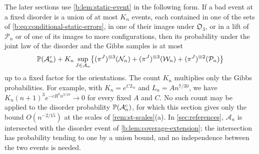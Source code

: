 \begin{remark}\label{rem:st-two-levels}
The later sections use \cref{b:lem:static-event} in the following form. If a bad event at a fixed disorder is a union of at most $K_n$ events, each contained in one of the sets of \eqref{b:eq:conditional-static-errors}, in one of their images under $\mathfrak O_3$, or in a lift of $\mathcal P_n$ or of one of its images to more configurations, then its probability under the joint law of the disorder and the Gibbs samples is at most
\[
 \mathbb P(\mathcal A_n^c)+K_n\sup_{J\in\mathcal A_n}\bigl\{(\pi^J)^{\otimes3}(\mathcal N_n)+(\pi^J)^{\otimes3}(\mathcal W_n)+(\pi^J)^{\otimes2}(\mathcal P_n)\bigr\}
\]
up to a fixed factor for the orientations. The count $K_n$ multiplies only the Gibbs probabilities. For example, with $K_n=e^{CL_n}$ and $L_n=An^{7/30}$, we have $K_n(n+1)^3e^{-cR^3n^{3/10}}\to0$ for every fixed $A$ and $C$. No such count may be applied to the disorder probability $\mathbb P(\mathcal A_n^c)$, for which this section gives only the bound $O(n^{-2/15})$ at the scales of \cref{rem:st-scales}(a). In \cref{sec:references}, $\mathcal A_n$ is intersected with the disorder event of \cref{b:lem:coverage-extension}; the intersection has probability tending to one by a union bound, and no independence between the two events is needed.
\end{remark}

